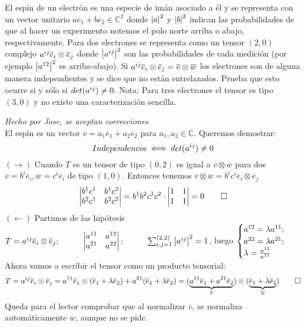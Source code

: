 \begin{problem}[9] El espín de un electrón es una especie de imán asociado a él y se representa con un vector unitario $a\overline{e}_1+b\overline{e}_2\in\mathbb{C}^2$ donde $\abs{a}^2$ y $\abs{b}^2$ indican las probabilidades de que al hacer un experimento notemos el polo norte arriba o abajo, respectivamente. Para dos electrones se representa como un tensor $(2,0)$ complejo $a^{i\space j}\overline{e}_i\otimes\overline{e}_j$ donde $\abs{a^{i\space j}}^2$ son las probabilidades de cada medición (por ejemplo $\abs{a^{1\space 2}}^2$ es arriba-abajo). Si $a^{i\space j}\overline{e}_i\otimes\overline{e}_j=\overline{v}\otimes\overline{w}$ los electrones son de alguna manera independientes y se dice que no están entrelazados. Prueba que esto ocurre si y sólo si $det(a^{i\space j})\neq0$. Nota: Para tres electrones el tensor es tipo $(3,0)$ y no existe una caracterización sencilla.
	
	\solution\textit{Hecho por Jose, se aceptan correcciones}\\ El espín es un vector $\overline{v}=a_1\overline{e}_1+a_2\overline{e}_2$ para $a_1,a_2\in\mathbb{C}$. Queremos demostrar:$$Independencia\iff det(a^{i\space j})\neq0$$
	$(\rightarrow)$ Cuando $T$ es un tensor de tipo $(0,2)$ es igual a $\overline{v}\otimes\overline{w}$ para dos $\overline{v}=b^i\overline{e}_i,\overline{w}=c^i\overline{e}_i$ de tipo $(1,0)$. Entonces tenemos $\overline{v}\otimes\overline{w}=b^ic^i\overline{e}_i\otimes\overline{e}_j$
	$$\begin{vmatrix}
	b^1c^1&b^1c^2\\
	b^2c^1&b^2c^2
	\end{vmatrix}=b^1b^2c^1c^2\cdot\begin{vmatrix}
	1&1\\
	1&1
	\end{vmatrix}=0\qed$$
	$(\leftarrow)$ Partimos de las hipótesis $T=a^{i\space j}\overline{e}_i\otimes\overline{e}_j;\hspace*{1cm}\begin{vmatrix}
	a^{1\space1}&a^{1\space2}\\
	a^{2\space1}&a^{2\space2}
	\end{vmatrix};\hspace*{1cm}\sum_{i,j=1}^{(2,2)}\abs{a^{i\space j}}^2=1$, luego $\begin{cases}
	a^{1\space 2}=\lambda a^{1\space 1};\\
	a^{2\space 2}=\lambda a^{2\space 1};\\
	\lambda=\frac{a^{1\space 2}}{a^{1\space 1}}
	\end{cases}$ Ahora vamos a escribir el tensor como un producto tensorial:
	$$T=a^{i\space j}\overline{e}_i\otimes\overline{e}_j=a^{1\space 1}\overline{e}_1\otimes(\overline{e}_1+\lambda\overline{e}_2)+a^{2\space 1}(\overline{e}_1+\lambda\overline{e}_2)=(\underbrace{a^{1\space 1}\overline{e}_1+a^{2\space 1}\overline{e}_2}_{\overline{v}})\otimes(\underbrace{\overline{e}_1+\lambda\overline{e}_2}_{\overline{w}})\qed$$ Queda para el lector comprobar que al normalizar $\overline{v}$, se normaliza automáticamente $\overline{w}$, aunque no se pide.
\end{problem}
